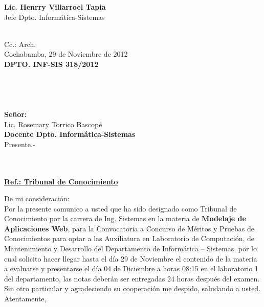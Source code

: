 \documentclass[letterpaper,11pt]{letter}
\begin{document}
\vspace{3.5cm}
\begin{center}
\begin{minipage}[b]{0.5\textwidth}
\begin{center}
{\bf Lic. Henrry Villarroel Tapia}\\
Jefe Dpto. Informática-Sistemas\\
\end{center}
\end{minipage}
\end{center}
~\\
Cc.: Arch.\\
\newpage
Cochabamba, 29 de Noviembre de 2012~\\
 \textbf{DPTO. INF-SIS 318/2012}\\
~\\
~\\
~\\
~\\
 \textbf{Señor:}~\\
Lic. Rosemary Torrico Bascopé~\\
 \textbf{Docente Dpto. Informática-Sistemas}~\\
Presente.-\\
~\\
~\\
\begin{center}
\underline{ \textbf{Ref.: Tribunal de Conocimiento}}
\end{center}
De mi consideración:\\
Por la presente comunico a usted que ha sido designado como Tribunal de Conocimiento por la carrera de Ing. Sistemas en la materia de \textbf{Modelaje de Aplicaciones Web}, para la Convocatoria a Concurso de Méritos y Pruebas de Conocimientos para optar a las Auxiliatura en Laboratorio de Computación, de Mantenimiento y Desarrollo del Departamento de Informática – Sistemas, por lo cual solicito hacer llegar hasta el día 29 de Noviembre el contenido de la materia a evaluarse y presentarse el día 04 de Diciembre a horas 08:15 en el laboratorio 1 del departamento, las notas deberán ser entregadas 24 horas después del examen.\\
Sin otro particular y agradeciendo su cooperación me despido, saludando a usted.\\
Atentamente,\\
\end{document}
